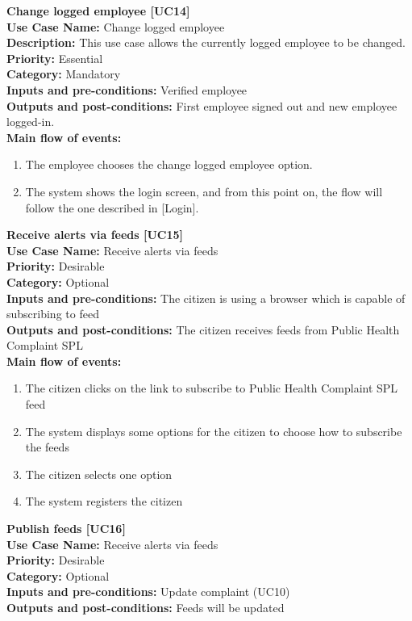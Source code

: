 \documentclass[11pt,twoside]{article}
\begin{document}
\textbf{Change logged employee [UC14]}\\
\textbf{Use Case Name:} Change logged employee\\
\textbf{Description:} This use case allows the currently logged employee to be changed.\\
\textbf{Priority:} Essential \\
\textbf{Category:} Mandatory \\
\textbf{Inputs and pre-conditions:} Verified employee \\
\textbf{Outputs and post-conditions:} First employee signed out and new employee logged-in.\\
\textbf{Main flow of events:}\\
\begin{enumerate}
\item The employee chooses the change logged employee option.
\item The system shows the login screen, and from this point on, the flow will follow the one described in [Login].\\
\end{enumerate}



\textbf{Receive alerts via feeds [UC15]}\\
\textbf{Use Case Name:} Receive alerts via feeds \\
\textbf{Priority:} Desirable  \\ 
\textbf{Category:} Optional \\ 
\textbf{Inputs and pre-conditions:} The citizen is using a browser which is capable of subscribing to feed \\ 
\textbf{Outputs and post-conditions:} The citizen receives feeds from Public Health Complaint SPL \\  
\textbf{Main flow of events:}\\
\begin{enumerate}
\item The citizen clicks on the link to subscribe to Public Health Complaint SPL feed
\item The system displays some options for the citizen to choose how to subscribe the feeds
\item The citizen selects one option
\item The system registers the citizen
\end{enumerate}

\textbf{Publish feeds [UC16]}\\
\textbf{Use Case Name:} Receive alerts via feeds \\
\textbf{Priority:} Desirable  \\ 
\textbf{Category:} Optional \\ 
\textbf{Inputs and pre-conditions:} Update complaint (UC10)\\ 
\textbf{Outputs and post-conditions:} Feeds will be updated \\  
\end{document}
